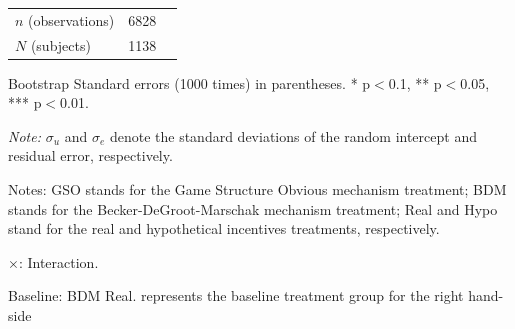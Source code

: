 \documentclass[12pt]{article}
\begin{document}
\begin{table}[H]
{\begin{tabular}{l*{1}{cc}}
\hline
\(n\) (observations)      &        6828         &            \\
\(N\) (subjects)       &        1138         &            \\
\hline \hline
\end{tabular}
}

\begin{tablenotes}
            \footnotesize
            \item Bootstrap Standard errors (1000 times) in parentheses. * p$<$0.1, ** p$<$0.05, *** p$<$0.01.
            \item \textit{Note:} $\sigma_u$ and $\sigma_e$ denote the standard deviations of the random intercept and residual error, respectively.
            \item Notes: GSO stands for the Game Structure Obvious mechanism treatment; BDM stands for the Becker-DeGroot-Marschak mechanism treatment; Real and Hypo stand for the real and hypothetical incentives treatments, respectively.
           \item $\times$: Interaction.
           \item Baseline: BDM Real. represents the baseline treatment group for the right hand-side \\
        \end{tablenotes}
\end{table}



\clearpage
\end{document}
